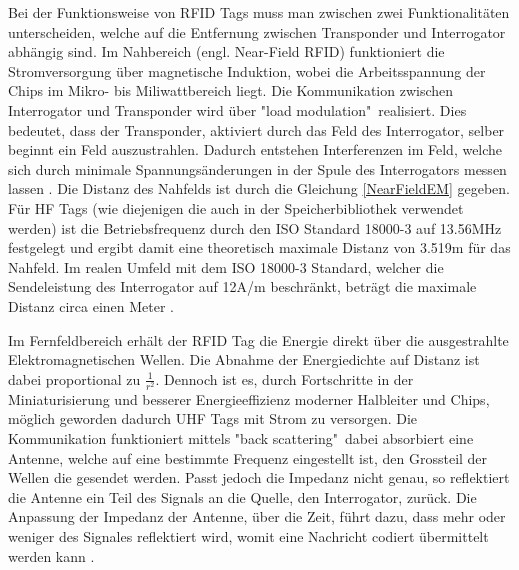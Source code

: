 Bei der Funktionsweise von \gls{RFID} Tags muss man zwischen zwei Funktionalitäten unterscheiden, welche auf die Entfernung zwischen Transponder und Interrogator abhängig sind. Im Nahbereich (engl. Near-Field \gls{RFID}) funktioniert die Stromversorgung über magnetische Induktion, wobei die Arbeitsspannung der Chips im Mikro- bis Miliwattbereich liegt. Die Kommunikation zwischen Interrogator und Transponder wird über "load modulation"\ realisiert. Dies bedeutet, dass der Transponder, aktiviert durch das Feld des Interrogator, selber beginnt ein Feld auszustrahlen. Dadurch entstehen Interferenzen im Feld, welche sich durch minimale Spannungsänderungen in der Spule des Interrogators messen lassen \parencite{want2006}. Die Distanz des Nahfelds ist durch die Gleichung \ref{NearFieldEM} gegeben. Für \gls{HF} Tags (wie diejenigen die auch in der Speicherbibliothek verwendet werden) ist die Betriebsfrequenz durch den ISO Standard 18000-3 auf 13.56MHz festgelegt und ergibt damit eine theoretisch maximale Distanz von 3.519m für das Nahfeld. Im realen Umfeld mit dem ISO 18000-3 Standard, welcher die Sendeleistung des Interrogator auf 12A/m beschränkt, beträgt die maximale Distanz circa einen Meter \parencite{ISO18000-3}.


Im Fernfeldbereich erhält der \gls{RFID} Tag die Energie direkt über die ausgestrahlte Elektromagnetischen Wellen. Die Abnahme der Energiedichte auf Distanz ist dabei proportional zu $\frac{1}{r^2}$. Dennoch ist es, durch Fortschritte in der Miniaturisierung und besserer Energieeffizienz moderner Halbleiter und Chips, möglich geworden dadurch \gls{UHF} Tags mit Strom zu versorgen. 
Die Kommunikation funktioniert mittels "back scattering"\, dabei absorbiert eine Antenne, welche auf eine bestimmte Frequenz eingestellt ist, den Grossteil der Wellen die gesendet werden. Passt jedoch die Impedanz nicht genau, so reflektiert die Antenne ein Teil des Signals an die Quelle, den Interrogator, zurück. Die Anpassung der Impedanz der Antenne, über die Zeit, führt dazu, dass mehr oder weniger des Signales reflektiert wird, womit eine Nachricht codiert übermittelt werden kann \parencite{want2006}.


